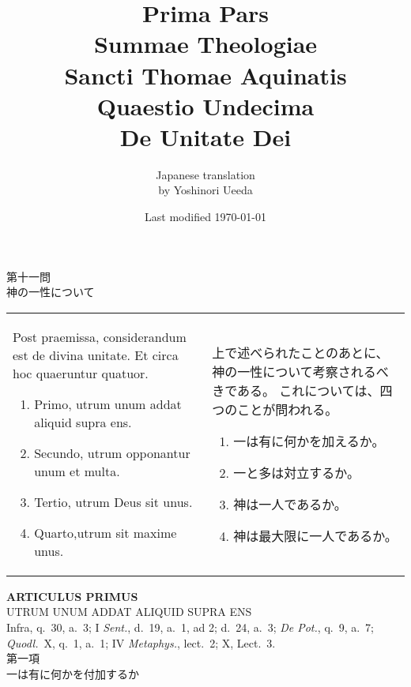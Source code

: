 \documentclass[10pt]{jsarticle} %
\title{{\bf Prima Pars}\\{\HUGE Summae Theologiae}\\Sancti Thomae
Aquinatis\\Quaestio Undecima\\{\bf De Unitate Dei}}
\author{Japanese translation\\by Yoshinori {\sc Ueeda}}
\date{Last modified \today}
\begin{document}
\maketitle
\begin{center}
 {\Large 第十一問\\神の一性について}
\end{center}



\begin{longtable}{p{21em}p{21em}}
Post praemissa, considerandum est de divina unitate. Et circa hoc
quaeruntur quatuor. 
\begin{enumerate}
 \item Primo, utrum unum addat aliquid supra ens.
 \item Secundo, utrum opponantur unum et multa.
 \item Tertio, utrum Deus sit unus.
 \item Quarto,utrum sit maxime unus.
\end{enumerate}

&

上で述べられたことのあとに、神の一性について考察されるべきである。
これについては、四つのことが問われる。
\begin{enumerate}
 \item 一は有に何かを加えるか。
 \item 一と多は対立するか。
 \item 神は一人であるか。
 \item 神は最大限に一人であるか。
\end{enumerate}

\end{longtable}
\newpage
{}

\begin{center}
 {\Large {\bf ARTICULUS PRIMUS}}\\
 {\large UTRUM UNUM ADDAT ALIQUID SUPRA ENS}\\
 {\footnotesize Infra, q.~30, a.~3; I {\itshape Sent.}, d.~19, a.~1, ad
 2; d.~24, a.~3; {\itshape De Pot.}, q.~9, a.~7; {\itshape Quodl.}~X,
 q.~1, a.~1; IV {\itshape Metaphys.}, lect.~2; X, Lect.~3.}\\
 {\Large 第一項\\一は有に何かを付加するか}
\end{center}
\end{document}
